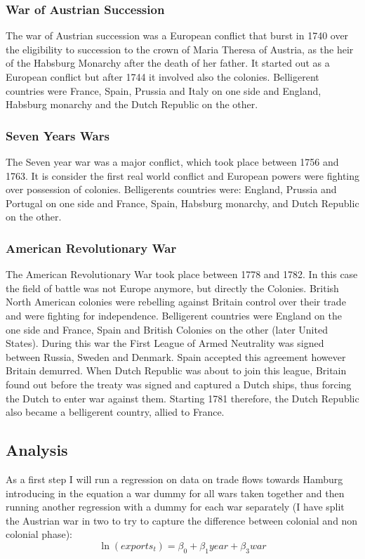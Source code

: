 \documentclass[12pt,a4paper,titlepage]{article}
\begin{document}
\subsubsection{War of Austrian Succession}
The war of Austrian succession was a European conflict that burst in 1740 over the eligibility to succession to the crown of Maria Theresa of Austria, as the heir of the Habsburg Monarchy after the death of her father. It started out as a European conflict but after 1744 it involved also the colonies. Belligerent countries were France, Spain, Prussia and Italy on one side and England, Habsburg monarchy and the Dutch Republic on the other. 

\subsubsection{Seven Years Wars}
The Seven year war was a major conflict, which took place between 1756 and 1763. It is consider the first real world conflict and European powers were fighting over possession of colonies. Belligerents countries were: England, Prussia and Portugal on one side and France, Spain, Habsburg monarchy, and Dutch Republic on the other. 

\subsubsection{American Revolutionary War}
The American Revolutionary War took place between 1778 and 1782. In this case the field of battle was not Europe anymore, but directly the Colonies. British North American colonies were rebelling against Britain control over their trade and were fighting for independence. Belligerent countries were England on the one side and France, Spain and British Colonies on the other (later United States). During this war the First League of Armed Neutrality was signed between Russia, Sweden and Denmark. Spain accepted this agreement however Britain demurred. When Dutch Republic was about to join this league, Britain found out before the treaty was signed and captured a Dutch ships, thus forcing the Dutch to enter war against them. Starting 1781 therefore, the Dutch Republic also became a belligerent country, allied to France. 

\subsection{Analysis}
As a first step I will run a regression on data on trade flows towards Hamburg introducing in the equation a war dummy for all wars taken together and then running another regression with a dummy for each war separately (I have split the Austrian war in two to try to capture the difference between colonial and non colonial phase):
\begin{equation}
\ln(exports_t)=\beta_0+\beta_1year+\beta_3war
\end{equation}
\end{document}
